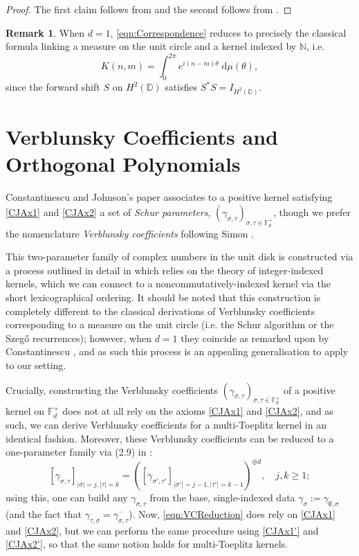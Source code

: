 \documentclass[11pt,reqno]{amsart}
\def\g{\gamma}
\def\s{\sigma}
\def\t{\tau}
\def\th{\theta}
\def\rmd{\mathrm{d}}
\def\NN{\mathbb{N}}
\def\DD{\mathbb{D}}
\def\FF{\mathbb{F}}
\theoremstyle{definition}
\newtheorem{remark}[theorem]{Remark}
\numberwithin{equation}{section}
\begin{document}
\begin{proof}
    The first claim follows from  and the second follows from .
\end{proof}

\begin{remark}
    When \(d=1\), \eqref{eqn:Correspondence} reduces to precisely the classical formula linking a measure on the unit circle and a kernel indexed by \(\NN\), i.e.
    \[
        K(n,m) = \int_0^{2\pi} e^{i(n-m)\th} \; \rmd \mu(\th),
    \]
    since the forward shift \(S\) on \(H^2(\DD)\) satisfies \(S^*S = I_{H^2(\DD)}\).
\end{remark}

\section{Verblunsky Coefficients and Orthogonal Polynomials}

Constantinescu and Johnson's paper \cite{CJ02b} associates to a positive kernel satisfying \eqref{CJAx1} and \eqref{CJAx2} a set of \emph{Schur parameters}, \((\g_{\s,\t})_{\s,\t \in \FF_d^+}\), though we prefer the nomenclature \emph{Verblunsky coefficients} following Simon \cite{Sim05}. 

This two-parameter family of complex numbers in the unit disk is constructed via a process outlined in detail in \cite{Con96} which relies on the theory of integer-indexed kernels, which we can connect to a noncommutatively-indexed kernel via the short lexicographical ordering. It should be noted that this construction is completely different to the classical derivations of Verblunsky coefficients corresponding to a measure on the unit circle (i.e. the Schur algorithm or the Szeg\H{o} recurrences); however, when \(d = 1\) they coincide as remarked upon by Constantinescu \cite{Con96}, and as such this process is an appealing generalisation to apply to our setting.

Crucially, constructing the Verblunsky coefficients \((\g_{\s,\t})_{\s,\t\in\FF_d^+}\) of a positive kernel on \(\FF_d^+\) does not at all rely on the axioms \eqref{CJAx1} and \eqref{CJAx2}, and as such, we can derive Verblunsky coefficients for a multi-Toeplitz kernel in an identical fashion. Moreover, these Verblunsky coefficients can be reduced to a one-parameter family via (2.9) in \cite{CJ02b}:
\begin{equation}
    \label{eqn:VCReduction}
    [\g_{\s,\t}]_{\lvert \s \rvert = j, \lvert \t \rvert = k} = ([\g_{\s', \t'}]_{\lvert \s' \rvert = j-1, \lvert \t' \rvert = k-1})^{\oplus d}, \quad j, k \geq 1;
\end{equation}
using this, one can build any \(\g_{\s,\t}\) from the base, single-indexed data \(\g_{\s} := \g_{\emptyset, \s}\) (and the fact that \(\g_{\t,\s} = \overline{\g_{\s,\t}}\)). Now, \eqref{eqn:VCReduction} does rely on \eqref{CJAx1} and \eqref{CJAx2}, but we can perform the same procedure using \eqref{CJAx1'} and \eqref{CJAx2'}, so that the same notion holds for multi-Toeplitz kernels.
\end{document}
